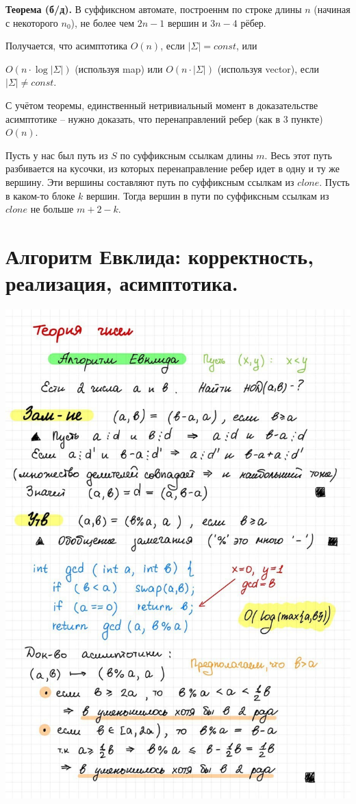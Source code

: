 \textbf{Теорема (б/д).}
В суффиксном автомате, построеннм по строке длины $n$ (начиная с некоторого $n_0$), не более чем $2n - 1$ вершин и $3n - 4$ рёбер.

Получается, что асимптотика $O(n)$, если $|\Sigma| = const$, или

$O(n \cdot \log |\Sigma|)$ (используя map) или $O(n \cdot |\Sigma|)$ (используя vector), если
$|\Sigma| \neq const$.

С учётом теоремы, единственный нетривиальный момент в доказательстве асимптотике -- нужно доказать, что перенаправлений ребер (как в 3 пункте) $O(n)$.

Пусть у нас был путь из $S$ по суффиксным ссылкам длины $m$. Весь этот путь разбивается на кусочки, из которых перенаправление ребер идет в одну и ту же вершину. Эти вершины составляют путь по суффиксным ссылкам из $clone$. Пусть в каком-то блоке $k$ вершин. Тогда вершин в пути по суффиксным ссылкам из $clone$ не больше $m + 2 - k$.

\newpage{}

\section{Алгоритм Евклида: корректность, реализация, асимптотика.}
\includegraphics[width=1\linewidth]{images/Evklid.jpg}

